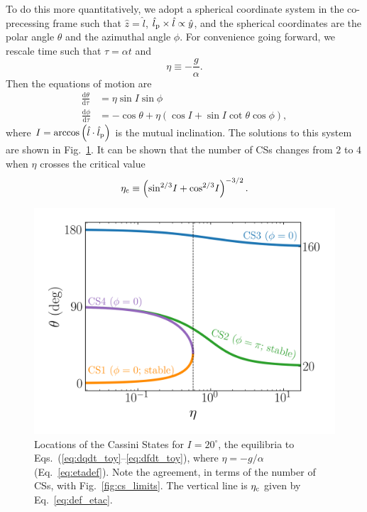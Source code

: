 \documentclass[11pt,
        usenames, %
        dvipsnames %
    ]{article}
\newcommand*{\rd}[2]{\frac{\mathrm{d}#1}{\mathrm{d}#2}}
\newcommand*{\p}[1]{\left(#1\right)}
\begin{document}
To do this more quantitatively, we adopt a spherical coordinate system in the
co-precessing frame such that $\hat{z} = \hat{l}$, $\hat{l}_{\rm p} \times
\hat{l} \propto \hat{y}$, and the spherical coordinates are the polar angle
$\theta$ and the azimuthal angle $\phi$. For convenience going forward,
we rescale time such that $\tau = \alpha t$ and
\begin{equation}
    \eta \equiv -\frac{g}{\alpha}.\label{eq:etadef}
\end{equation}
Then the equations of motion are
\begin{align}
    \rd{\theta}{\tau} &= \eta\sin I \sin \phi \label{eq:dqdt_toy}\\
    \rd{\phi}{\tau} &= - \cos\theta
        + \eta\p{\cos I + \sin I \cot \theta \cos \phi},\label{eq:dfdt_toy}
\end{align}
where $I = \arccos\p{\hat{l} \cdot \hat{l}_{\rm p}}$ is the mutual inclination.
The solutions to this system are shown in Fig.~\ref{fig:cs_locs}. It can be
shown that the number of CSs changes from $2$ to $4$ when $\eta$ crosses the
critical value
\begin{equation}
    \eta_{\rm c} \equiv \p{\sin^{2/3}\!I + \cos^{2/3}\!I}^{-3/2}.
        \label{eq:def_etac}
\end{equation}
\begin{figure}
    \centering
    \includegraphics[width=0.5\columnwidth]{2_cs_locs_phi.png}
    \caption{Locations of the Cassini States for $I = 20^\circ$, the equilibria
    to Eqs.~(\ref{eq:dqdt_toy}--\ref{eq:dfdt_toy}), where $\eta = -g/\alpha$
    (Eq.~\ref{eq:etadef}). Note the agreement, in terms of the number of CSs,
    with Fig.~\ref{fig:cs_limits}. The vertical line is $\eta_{\rm c}$ given by
    Eq.~\eqref{eq:def_etac}.}\label{fig:cs_locs}
\end{figure}
\end{document}
